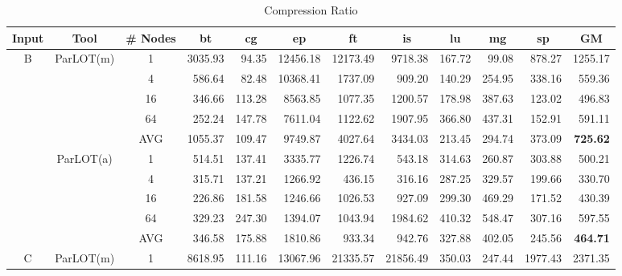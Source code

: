 \begin{table*}[]
\caption{ Compression Ratio }
\label{comet_cr_pMpA_BC_itn_p3.5}\begin{center}

\begin{tabular}{|c|c|c|rrrrrrrr|r|}
\hline
Input & Tool & \# Nodes  & \multicolumn{1}{c}{bt} & \multicolumn{1}{c}{cg} & \multicolumn{1}{c}{ep} & \multicolumn{1}{c}{ft} & \multicolumn{1}{c}{is} & \multicolumn{1}{c}{lu} & \multicolumn{1}{c}{mg} & \multicolumn{1}{c|}{sp} & \multicolumn{1}{c|}{GM} \\ \hline
\multirow{10}{*}{B} & \multirow{5}{*}{ParLOT(m)} & 1 & 3035.93 &  94.35 & 12456.18 & 12173.49 &  9718.38 & 167.72 &  99.08 &  878.27 & 1255.17 \\
 & & 4                                               &  586.64 &  82.48 & 10368.41 &  1737.09 &   909.20 & 140.29 & 254.95 &  338.16 &  559.36 \\
 & & 16                                              &  346.66 & 113.28 &  8563.85 &  1077.35 &  1200.57 & 178.98 & 387.63 &  123.02 &  496.83 \\
 & & 64                                              &  252.24 & 147.78 &  7611.04 &  1122.62 &  1907.95 & 366.80 & 437.31 &  152.91 &  591.11 \\ \cline{3-12} 
 & & AVG                                             & 1055.37 & 109.47 &  9749.87 &  4027.64 &  3434.03 & 213.45 & 294.74 &  373.09 &  \textbf{725.62}  \\ \cline{2-12} 
 & \multirow{5}{*}{ParLOT(a)} & 1 &  514.51 & 137.41 &  3335.77 &  1226.74 &   543.18 & 314.63 & 260.87 &  303.88 &  500.21 \\
 & & 4                            &  315.71 & 137.21 &  1266.92 &   436.15 &   316.16 & 287.25 & 329.57 &  199.66 &  330.70 \\
 & & 16                           &  226.86 & 181.58 &  1246.66 &  1026.53 &   927.09 & 299.30 & 469.29 &  171.52 &  430.39 \\
 & & 64                           &  329.23 & 247.30 &  1394.07 &  1043.94 &  1984.62 & 410.32 & 548.47 &  307.16 &  597.55 \\ \cline{3-12} 
 & & AVG                          &  346.58 & 175.88 &  1810.86 &   933.34 &   942.76 & 327.88 & 402.05 &  245.56 &  \textbf{464.71} \\ \hline 
 \multirow{10}{*}{C} & \multirow{5}{*}{ParLOT(m)} & 1  & 8618.95 & 111.16 & 13067.96 & 21335.57 & 21856.49 & 350.03 & 247.44 & 1977.43 & 2371.35  \\

\end{tabular}
\end{center}
\end{table*}
